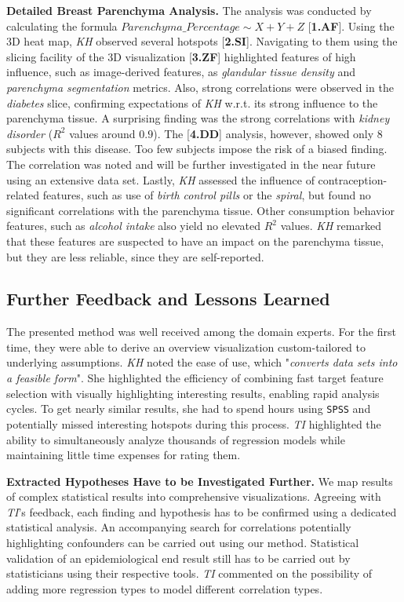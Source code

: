 \documentclass[journal]{style/vgtc} 			          %
\begin{document}
\textbf{Detailed Breast Parenchyma Analysis.}
The analysis was conducted by calculating the formula $Parenchyma\_Percentage \sim X + Y + Z$ [\textbf{1.AF}].
Using the 3D heat map, \emph{KH} observed several hotspots [\textbf{2.SI}].
Navigating to them using the slicing facility of the 3D visualization [\textbf{3.ZF}] highlighted features of high influence, such as image-derived features, as \emph{glandular tissue density} and \emph{parenchyma segmentation} metrics.
Also, strong correlations were observed in the \emph{diabetes} slice, confirming expectations of \emph{KH} w.r.t. its strong influence to the parenchyma tissue.
A surprising finding was the strong correlations with \emph{kidney disorder} ($R^2$ values around $0.9$).
The [\textbf{4.DD}] analysis, however, showed only 8 subjects with this disease.
Too few subjects impose the risk of a biased finding.
The correlation was noted and will be further investigated in the near future using an extensive data set.
Lastly, \emph{KH} assessed the influence of contraception-related features, such as use of \emph{birth control pills} or the \emph{spiral}, but found no significant correlations with the parenchyma tissue.
Other consumption behavior features, such as \emph{alcohol intake} also yield no elevated $R^2$ values.
\emph{KH} remarked that these features are suspected to have an impact on the parenchyma tissue, but they are less reliable, since they are self-reported.
\subsection{Further Feedback and Lessons Learned} \label{Lessons Learned}
The presented method was well received among the domain experts.
For the first time, they were able to derive an overview visualization custom-tailored to underlying assumptions.
\emph{KH} noted the ease of use, which "\emph{converts data sets into a feasible form}".
She highlighted the efficiency of combining fast target feature selection with visually highlighting interesting results, enabling rapid analysis cycles.
To get nearly similar results, she had to spend hours using \texttt{SPSS} and potentially missed interesting hotspots during this process.
\emph{TI} highlighted the ability to simultaneously analyze thousands of regression models while maintaining little time expenses for rating them.

\textbf{Extracted Hypotheses Have to be Investigated Further.}
We map results of complex statistical results into comprehensive visualizations.
Agreeing with \emph{TI}'s feedback, each finding and hypothesis has to be confirmed using a dedicated statistical analysis.
An accompanying search for correlations potentially highlighting confounders can be carried out using our method.
Statistical validation of an epidemiological end result still has to be carried out by statisticians using their respective tools.
\emph{TI} commented on the possibility of adding more regression types to model different correlation types.%
\end{document}
